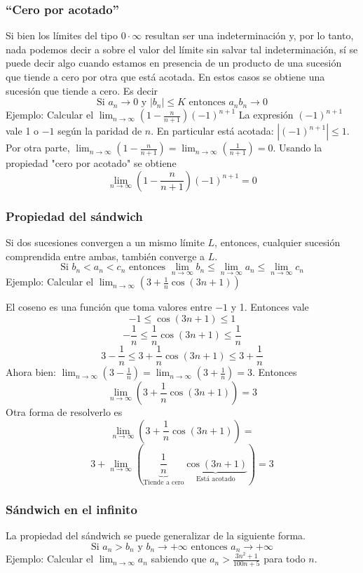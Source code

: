 \documentclass[../teoria.root.tex]{subfiles}
\begin{document}
\subsubsection{``Cero por acotado''}
Si bien los límites del tipo \(0\cdot\infty\) resultan ser una indeterminación y, por lo tanto, nada podemos decir a sobre el valor del límite sin salvar tal indeterminación, sí se puede decir algo cuando estamos en presencia de un producto de una sucesión que tiende a cero por otra que está acotada.
En estos casos se obtiene una sucesión que tiende a cero.
Es decir \[\text{Si }a_n\rightarrow0\text{ y }|b_n|\leq K\text{ entonces }a_nb_n\rightarrow0\]
Ejemplo: Calcular el \(\lim_{n\to\infty}\left(1-\frac{n}{n+1}\right)(-1)^{n+1}\)
La expresión \((-1)^{n+1}\) vale 1 o \(-1\) según la paridad de \(n\).
En particular está acotada: \(|(-1)^{n+1}|\leq1\).
Por otra parte, \(\lim_{n\to\infty}\left(1-\frac{n}{n+1}\right)=\lim_{n\to\infty}\left(\frac{1}{n+1}\right)=0\).
Usando la propiedad "cero por acotado" se obtiene
\[\lim_{n\to\infty}\left(1-\frac{n}{n+1}\right)(-1)^{n+1}=0\]
\subsubsection{Propiedad del sándwich}
Si dos sucesiones convergen a un mismo límite \(L\), entonces, cualquier sucesión comprendida entre ambas, también converge a \(L\).
\[\text{Si }b_n<a_n<c_n\text{ entonces }\lim_{n\to\infty}b_n\leq\lim_{n\to\infty}a_n\leq\lim_{n\to\infty}c_n\]
Ejemplo: Calcular el \(\lim_{n\to\infty}\left(3+\frac{1}{n}\cos(3n+1)\right)\)

El coseno es una función que toma valores entre \(-1\) y 1.
Entonces vale
\[-1\leq\cos(3n+1)\leq1\]
\[-\frac{1}{n}\leq\frac{1}{n}\cos(3n+1)\leq\frac{1}{n}\]
\[3-\frac{1}{n}\leq3+\frac{1}{n}\cos(3n+1)\leq3+\frac{1}{n}\]
Ahora bien: \(\lim_{n\to\infty}\left(3-\frac{1}{n}\right)=\lim_{n\to\infty}\left(3+\frac{1}{n}\right)=3\).
Entonces \[\lim_{n\to\infty}\left(3+\frac{1}{n}\cos(3n+1)\right)=3\]
Otra forma de resolverlo es
\[\lim_{n\to\infty}\left(3+\frac{1}{n}\cos(3n+1)\right)=\]
\[3+\lim_{n\to\infty}\left(\underbrace{\frac{1}{n}}_{\text{Tiende a cero}}\underbrace{\cos(3n+1)}_{\text{Está acotado}}\right)=3\]
\subsubsection{Sándwich en el infinito}
La propiedad del sándwich se puede generalizar de la siguiente forma.
\[\text{Si }a_n>b_n\text{ y }b_n\rightarrow+\infty\text{ entonces }a_n\rightarrow+\infty\]
Ejemplo: Calcular el \(\lim_{n\to\infty}a_n\) sabiendo que \(a_n>\frac{3n^2+1}{100n+5}\) para todo \(n\).
\end{document}
